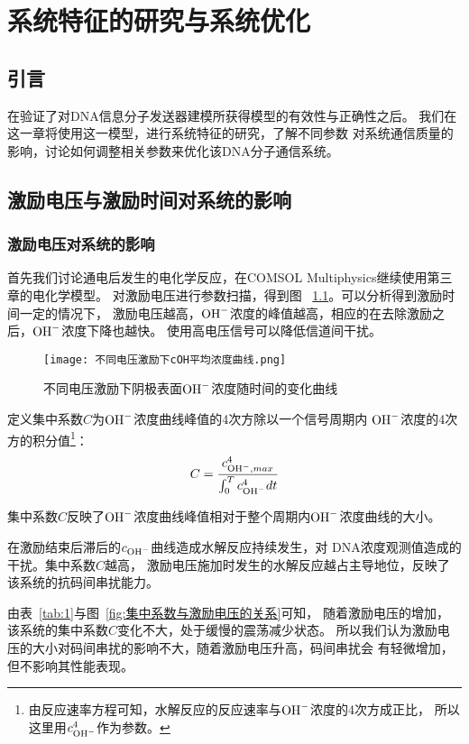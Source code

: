 \chapter{系统特征的研究与系统优化}
\section{引言}
在验证了对DNA信息分子发送器建模所获得模型的有效性与正确性之后。
我们在这一章将使用这一模型，进行系统特征的研究，了解不同参数
对系统通信质量的影响，讨论如何调整相关参数来优化该DNA分子通信系统。

\section{激励电压与激励时间对系统的影响}
\subsection{激励电压对系统的影响}

首先我们讨论通电后发生的电化学反应，在COMSOL Multiphysics继续使用第三章的电化学模型。
对激励电压进行参数扫描，得到图 ~\ref{fig:cOH_U}。可以分析得到激励时间一定的情况下，
激励电压越高，$\ce{OH-}$浓度的峰值越高，相应的在去除激励之后，$\ce{OH-}$浓度下降也越快。
使用高电压信号可以降低信道间干扰。

\begin{figure}[b]
    \centering
    \texttt{[image: 不同电压激励下cOH平均浓度曲线.png]}
    \caption{不同电压激励下阴极表面$\ce{OH-}$浓度随时间的变化曲线}
    \label{fig:cOH_U}
\end{figure}

定义集中系数$C$为$\ce{OH-}$浓度曲线峰值的4次方除以一个信号周期内
$\ce{OH-}$浓度的4次方的积分值\footnote{
    由反应速率方程可知，水解反应的反应速率与$\ce{OH-}$浓度的4次方成正比，
    所以这里用$c_{\ce{OH-}}^4$作为参数。
}：
\begin{equation}
    C=\frac{c_{\ce{OH-},max}^4}{\int_0^T{c_{\ce{OH-}}^4}dt}
\end{equation}

集中系数$C$反映了$\ce{OH-}$浓度曲线峰值相对于整个周期内$\ce{OH-}$浓度曲线的大小。

在激励结束后滞后的$c_{\ce{OH-}}$曲线造成水解反应持续发生，对
DNA浓度观测值造成的干扰。集中系数$C$越高，
激励电压施加时发生的水解反应越占主导地位，反映了该系统的抗码间串扰能力。

由表~\ref{tab:1}与图~\ref{fig:集中系数与激励电压的关系}可知，
随着激励电压的增加，该系统的集中系数$C$变化不大，处于缓慢的震荡减少状态。
所以我们认为激励电压的大小对码间串扰的影响不大，随着激励电压升高，码间串扰会
有轻微增加，但不影响其性能表现。

